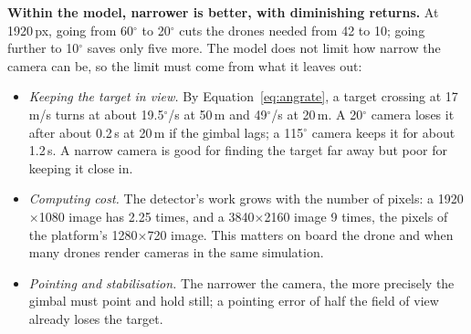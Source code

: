 \textbf{Within the model, narrower is better, with diminishing returns.} At
1920\,px, going from 60$^\circ$ to 20$^\circ$ cuts the drones needed from 42
to 10; going further to 10$^\circ$ saves only five more. The model
does not limit how narrow the camera can be, so the limit must come from what
it leaves out:
\begin{itemize}
  \item \emph{Keeping the target in view.} By Equation~\eqref{eq:angrate}, a
        target crossing at 17\,m/s turns at about 19.5$^\circ$/s at 50\,m and
        49$^\circ$/s at 20\,m. A 20$^\circ$ camera loses it after about
        0.2\,s at 20\,m if the gimbal lags; a 115$^\circ$ camera keeps it for
        about 1.2\,s. A narrow camera is good for finding the target far away
        but poor for keeping it close in.
  \item \emph{Computing cost.} The detector's work grows with the number of
        pixels: a 1920$\times$1080 image has 2.25 times, and a
        3840$\times$2160 image 9 times, the pixels of the platform's
        1280$\times$720 image. This matters on board the drone and when many
        drones render cameras in the same simulation.
  \item \emph{Pointing and stabilisation.} The narrower the camera, the more
        precisely the gimbal must point and hold still; a pointing error of
        half the field of view already loses the target.
\end{itemize}

